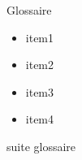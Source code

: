 \begin{cadre}[A1][A4] 
    Glossaire
    \begin{itemize}
    \item item1
    \item item2
    \item item3
    \item item4
    \end{itemize}
    suite glossaire
\end{cadre}
    